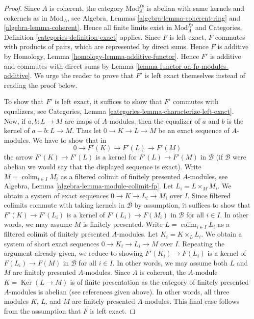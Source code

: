 \documentclass[10pt,a4paper]{amsart}
\theoremstyle{plain}
\theoremstyle{definition}
\theoremstyle{remark}
\numberwithin{equation}{subsection}
\def\colim{\mathop{\mathrm{colim}}\nolimits}
\def\Ker{\mathop{\mathrm{Ker}}}
\begin{document}
\begin{proof}
Since $A$ is coherent, the category $\text{Mod}^{fp}_A$ is abelian
with same kernels and cokernels as in $\text{Mod}_A$, see
Algebra, Lemmas \ref{algebra-lemma-coherent-ring} and
\ref{algebra-lemma-coherent}. Hence all finite limits exist in
$\text{Mod}^{fp}_A$ and
Categories, Definition \ref{categories-definition-exact} applies.
Since $F$ is left exact, $F$ commutes with products of pairs, which are
represented by direct sums. Hence $F$ is additive by
Homology, Lemma \ref{homology-lemma-additive-functor}.
Hence $F'$ is additive and commutes with direct sums by
Lemma \ref{lemma-functor-on-fp-modules-additive}.
We urge the reader to prove that $F'$ is left exact themselves
instead of reading the proof below.

\medskip\noindent
To show that $F'$ is left exact, it suffices to show that $F'$ commutes
with equalizers, see
Categories, Lemma \ref{categories-lemma-characterize-left-exact}.
Now, if $a, b : L \to M$ are maps of $A$-modules, then the
equalizer of $a$ and $b$ is the kernel of $a - b : L \to M$.
Thus let $0 \to K \to L \to M$ be an exact sequence
of $A$-modules. We have to show that in
$$
0 \to F'(K) \to F'(L) \to F'(M)
$$
the arrow $F'(K) \to F'(L)$ is a kernel for $F'(L) \to F'(M)$ in $\mathcal{B}$
(if $\mathcal{B}$ were abelian we would say that the displayed sequence
is exact).
Write $M = \colim_{i \in I} M_i$ as a filtered colimit of finitely
presented $A$-modules, see
Algebra, Lemma \ref{algebra-lemma-module-colimit-fp}.
Let $L_i = L \times_M M_i$. 
We obtain a system of exact sequences $0 \to K \to L_i \to M_i$
over $I$. Since filtered colimits commute with taking kernels
in $\mathcal{B}$ by assumption, 
it suffices to show that $F'(K) \to F'(L_i)$ is a kernel of
$F'(L_i) \to F(M_i)$ in $\mathcal{B}$ for all $i \in I$. In other words, we may
assume $M$ is finitely presented. Write $L = \colim_{i \in I} L_i$
as a filtered colimit of finitely presented $A$-modules.
Let $K_i = K \times_L L_i$. We obtain a system of short exact sequences
$0 \to K_i \to L_i \to M$ over $I$.
Repeating the argument already given, we reduce to showing
$F'(K_i) \to F(L_i)$ is a kernel of
$F(L_i) \to F(M)$ in $\mathcal{B}$ for all $i \in I$.
In other words, we may assume both
$L$ and $M$ are finitely presented $A$-modules.
Since $A$ is coherent, the $A$-module $K = \Ker(L \to M)$ is
of finite presentation as the category of finitely presented
$A$-modules is abelian (see references given above).
In other words, all three modules $K$, $L$, and $M$
are finitely presented $A$-modules. This final case follows
from the assumption that $F$ is left exact.
\end{proof}
\end{document}
